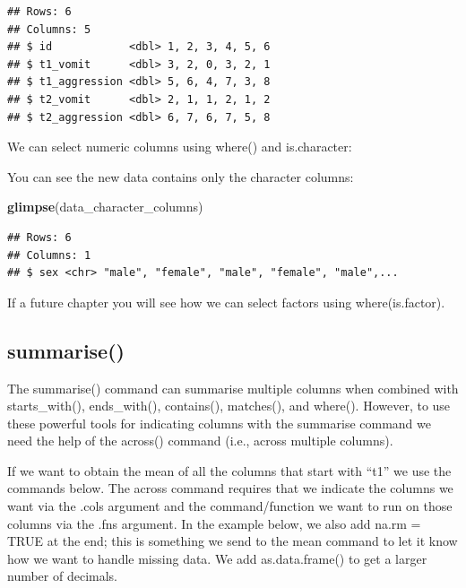 \documentclass[
]{krantz}
\makeatletter
\newenvironment{Shaded}{\begin{snugshade}}{\end{snugshade}}
\newcommand{\KeywordTok}[1]{\textcolor[rgb]{0.27,0.27,0.27}{\textbf{#1}}}
\newcommand{\NormalTok}[1]{#1}
\newcommand{\OperatorTok}[1]{\textcolor[rgb]{0.43,0.43,0.43}{\textbf{#1}}}
\newcommand{\StringTok}[1]{\textcolor[rgb]{0.5,0.5,0.5}{#1}}
\newenvironment{kframe}{%
\medskip{}
\setlength{\fboxsep}{.8em}
 \def\at@end@of@kframe{}%
 \ifinner\ifhmode%
  \def\at@end@of@kframe{\end{minipage}}%
  \begin{minipage}{\columnwidth}%
 \fi\fi%
 \def\FrameCommand##1{\hskip\@totalleftmargin \hskip-\fboxsep
 \colorbox{shadecolor}{##1}\hskip-\fboxsep
     \hskip-\linewidth \hskip-\@totalleftmargin \hskip\columnwidth}%
 \MakeFramed {\advance\hsize-\width
   \@totalleftmargin\z@ \linewidth\hsize
   \@setminipage}}%
 {\par\unskip\endMakeFramed%
 \at@end@of@kframe}
\renewenvironment{Shaded}{\begin{kframe}}{\end{kframe}}
\makeatother
\begin{document}
\begin{verbatim}
## Rows: 6
## Columns: 5
## $ id            <dbl> 1, 2, 3, 4, 5, 6
## $ t1_vomit      <dbl> 3, 2, 0, 3, 2, 1
## $ t1_aggression <dbl> 5, 6, 4, 7, 3, 8
## $ t2_vomit      <dbl> 2, 1, 1, 2, 1, 2
## $ t2_aggression <dbl> 6, 7, 6, 7, 5, 8
\end{verbatim}

We can select numeric columns using where() and is.character:

\begin{Shaded}
\end{Shaded}

You can see the new data contains only the character columns:

\begin{Shaded}
\begin{Highlighting}[]
\KeywordTok{glimpse}\NormalTok{(data_character_columns)}
\end{Highlighting}
\end{Shaded}

\begin{verbatim}
## Rows: 6
## Columns: 1
## $ sex <chr> "male", "female", "male", "female", "male",...
\end{verbatim}

If a future chapter you will see how we can select factors using where(is.factor).

\hypertarget{summarise-1}{%
\subsection{summarise()}\label{summarise-1}}

The summarise() command can summarise multiple columns when combined with starts\_with(), ends\_with(), contains(), matches(), and where(). However, to use these powerful tools for indicating columns with the summarise command we need the help of the across() command (i.e., across multiple columns).

If we want to obtain the mean of all the columns that start with ``t1'' we use the commands below. The across command requires that we indicate the columns we want via the .cols argument and the command/function we want to run on those columns via the .fns argument. In the example below, we also add na.rm = TRUE at the end; this is something we send to the mean command to let it know how we want to handle missing data. We add as.data.frame() to get a larger number of decimals.
\end{document}
